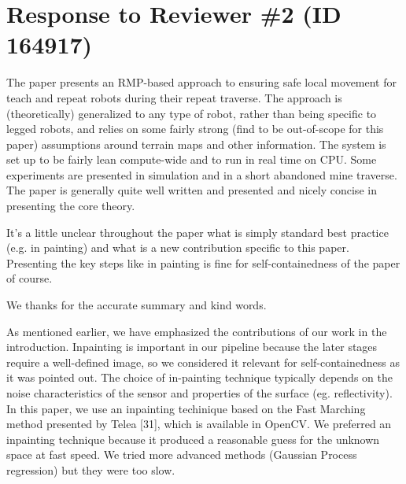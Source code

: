 \documentclass[a4paper,11pt]{article}
\begin{document}



\pagebreak
\section*{Response to Reviewer \#2 (ID 164917)}

\begin{displayquote}
	The paper presents an RMP-based approach to ensuring safe local
	movement for teach and repeat robots during their repeat traverse. The
	approach is (theoretically) generalized to any type of robot, rather
	than being specific to legged robots, and relies on some fairly strong
	(find to be out-of-scope for this paper) assumptions around terrain
	maps and other information. The system is set up to be fairly lean
	compute-wide and to run in real time on CPU. Some experiments are
	presented in simulation and in a short abandoned mine traverse. The
	paper is generally quite well written and presented and nicely concise
	in presenting the core theory.

	It's a little unclear throughout the paper what is simply standard best
	practice (e.g. in painting) and what is a new contribution specific to
	this paper. Presenting the key steps like in painting is fine for
	self-containedness of the paper of course.
\end{displayquote}

We thanks for the accurate summary and kind words.

\begin{outline}[enumerate]
	\1 As mentioned earlier, we have emphasized the contributions of our 
	work in the introduction. 
	\1 Inpainting is important in our pipeline because the later stages 
	require a well-defined image, so we considered it relevant for 
	self-containedness as it was pointed out.
	\1 The choice of in-painting technique typically depends on the noise 
	characteristics of the sensor and properties of the surface (eg. 
	reflectivity). In this paper, we use an inpainting techinique based on the 
	Fast Marching method presented by Telea [31], which is available in OpenCV. 
	\1 We preferred an inpainting technique because it produced a reasonable 
	guess for the unknown space at fast speed. We tried more advanced methods 
	(Gaussian Process regression) but they were too slow.
\end{outline}
\end{document}
